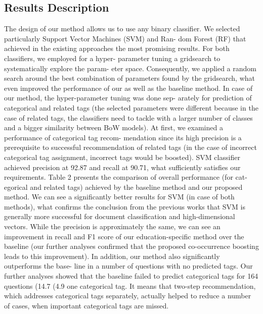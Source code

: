 \documentclass{sig-alternate}
\begin{document}
\subsection{Results Description
}The design of our method allows us to use any binary classifier.
We selected particularly Support Vector Machines (SVM) and Ran-
dom Forest (RF) that achieved in the existing approaches the most
promising results. For both classifiers, we employed for a hyper-
parameter tuning a gridsearch to systematically explore the param-
eter space. Consequently, we applied a random search around the
best combination of parameters found by the gridsearch, what even
improved the performance of our as well as the baseline method.
In case of our method, the hyper-parameter tuning was done sep-
arately for prediction of categorical and related tags (the selected
parameters were different because in the case of related tags, the
classifiers need to tackle with a larger number of classes and a
bigger similarity between BoW models).
At first, we examined a performance of categorical tag recom-
mendation since its high precision is a prerequisite to successful
recommendation of related tags (in the case of incorrect categorical
tag assignment, incorrect tags would be boosted). SVM classifier
achieved precision at 92.87 and recall at 90.71, what sufficiently
satisfies our requirements.
Table 2 presents the comparison of overall performance (for cat-
egorical and related tags) achieved by the baseline method and our
proposed method. We can see a significantly better results for SVM
(in case of both methods), what confirms the conclusion from the
previous works that SVM is generally more successful for document
classification and high-dimensional vectors. While the precision
is approximately the same, we can see an improvement in recall
and F1 score of our education-specific method over the baseline
(our further analyses confirmed that the proposed co-occurrence
boosting leads to this improvement).
In addition, our method also significantly outperforms the base-
line in a number of questions with no predicted tags. Our further
analyses showed that the baseline failed to predict categorical tags
for 164 questions (14.7%
(4.9%
one categorical tag. It means that two-step recommendation, which
addresses categorical tags separately, actually helped to reduce a
number of cases, when important categorical tags are missed.
\end{document}
